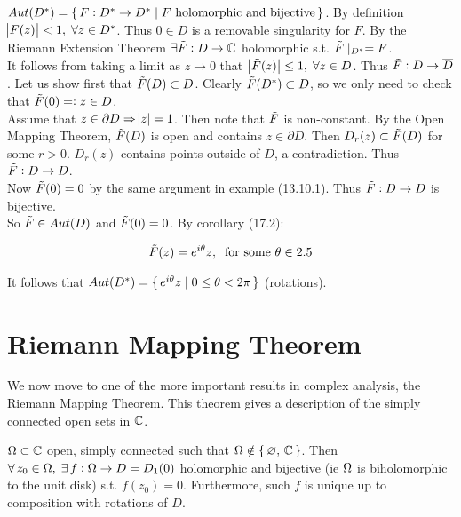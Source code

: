 \begin{example}[$Aut(D^*)$]

$Aut(D^*) = \set{ F : D^* \to D^* \mid F \text{ holomorphic and bijective}}$. By definition $\abs{F(z)} < 1, \; \forall z \in D^*$. Thus $0 \in D$ is a removable singularity for $F$. By the Riemann Extension Theorem $\exists \Tilde{F} : D \to \mathbb{C}$ holomorphic s.t. $\Tilde{F} \mid_{D^*} = F$.\\

It follows from taking a limit as $z \to 0$ that $ \big| \Tilde{F} (z)\big| \leq 1, \; \forall z \in D$. Thus $\Tilde{F} : D \to \overline{D}$. Let us show first that $\Tilde{F} (D) \subset D$. Clearly $\Tilde{F} ( D^*) \subset D$, so we only need to check that $\Tilde{F} (0) = \vcentcolon z \in D$.\\

Assume that $z \in \partial D \Rightarrow \abs{z} = 1$. Then note that $\Tilde{F}$ is non-constant. By the Open Mapping Theorem, $\Tilde{F} (D)$ is open and contains $z \in \partial D$. Then $D_r(z) \subset \Tilde{F} (D)$ for some $r>0$. $D_r(z) $ contains points outside of $\overline{D}$, a contradiction. Thus $\Tilde{F}:D \to D$.\\

Now $\Tilde{F}(0)=0$ by the same argument in example (13.10.1). Thus $\Tilde{F} : D \to D$ is bijective.\\

So $\Tilde{F} \in Aut(D)$ and $\Tilde{F}(0) = 0$. By corollary (17.2):

\begin{align*}
    \Tilde{F} (z) = e^{i \theta} z, \: \text{ for some $\theta \in 2.5$}
\end{align*}


It follows that $Aut(D^*) = \set{ e^{i \theta} z \mid 0 \leq \theta < 2 \pi}$ (rotations).

\end{example}

\section{Riemann Mapping Theorem}

We now move to one of the more important results in complex analysis, the Riemann Mapping Theorem. This theorem gives a description of the simply connected open sets in $\mathbb{C}$.

\begin{theorem}
 $\Omega \subset \mathbb{C}$ open, simply connected such that $\Omega \notin \set{\varnothing, \, \mathbb{C}}$. Then $\forall \, z_0 \in \Omega, \; \exists \, f : \Omega \to D = D_1(0)$ holomorphic and bijective (ie $\Omega$ is biholomorphic to the unit disk) s.t. $f(z_0) = 0$. Furthermore, such $f$ is unique up to composition with rotations of $D$.
\end{theorem}

